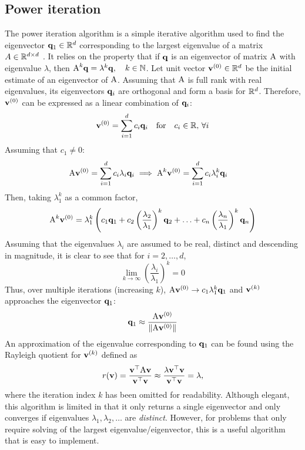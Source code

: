 \subsection{Power iteration}
\label{subsection:power-iteration-c3}
The power iteration algorithm is a simple iterative algorithm used to find the eigenvector ${\mathbf{q}}_1 \in \mathbb{R}^d$ corresponding to the largest eigenvalue of a matrix $A\in \mathbb{R}^{d\times d}$ \cite{panju-iterative-eig}. It relies on the property that if ${\mathbf{q}}$ is an eigenvector of matrix ${\textrm{A}}$ with eigenvalue $\lambda$, then ${\textrm{A}}^k {\mathbf{q}} = \lambda^k{\mathbf{q}}, \quad k\in \mathbb{N}$. Let unit vector ${\mathbf{v}}^{(0)} \in \mathbb{R}^d$ be the initial estimate of an eigenvector of ${\textrm{A}}$. Assuming that ${\textrm{A}}$ is full rank with real eigenvalues, its eigenvectors ${\mathbf{q}}_i$ are orthogonal and form a basis for $\mathbb{R}^d$. Therefore, ${\mathbf{v}}^{(0)}$ can be expressed as a linear combination of ${\mathbf{q}}_i$:
\begin{equation}
    {\mathbf{v}}^{(0)} = \sum_{i=1}^{d} c_i{\mathbf{q}}_i \quad \text{for} \quad c_i \in \mathbb{R}, \, \forall i
\label{eq:power-iter-lin-sum}
\end{equation}
Assuming that $c_1 \neq 0$:
\begin{equation}
\begin{aligned}
{\textrm{A}} {\mathbf{v}}^{(0)} &= \sum_{i=1}^{d} c_i\lambda_i{\mathbf{q}}_i \implies
{\textrm{A}}^{k} {\mathbf{v}}^{(0)} = \sum_{i=1}^{d} c_i\lambda_i^k{\mathbf{q}}_i
\end{aligned}
\end{equation}
Then, taking $\lambda_1^k$ as a common factor,
\begin{equation}
   {\textrm{A}}^{k} {\mathbf{v}}^{(0)} = \lambda_{1}^{k}\left(c_{1} {\mathbf{q}}_{1}+c_{2}\left(\frac{\lambda_{2}}{\lambda_{1}}\right)^{k} {\mathbf{q}}_{2}+\ldots+c_{n}\left(\frac{\lambda_{n}}{\lambda_{1}}\right)^{k} {\mathbf{q}}_{n}\right)
\end{equation}
Assuming that the eigenvalues $\lambda_i$ are assumed to be real, distinct and descending in magnitude, it is clear to see that for $i = 2, \dots, d$,
\begin{equation}
    \lim _{k \rightarrow \infty}\left(\frac{\lambda_{i}}{\lambda_{1}}\right)^{k}=0
\end{equation}
Thus, over multiple iterations (increasing $k$), ${\textrm{A}} {\mathbf{v}}^{(0)} \rightarrow c_1\lambda_1^k {\mathbf{q}}_1$ and ${\mathbf{v}}^{(k)}$ approaches the eigenvector ${\mathbf{q}}_1$:
\begin{equation}
    {\mathbf{q}}_1 \approx \frac{{\textrm{A}} {\mathbf{v}}^{(0)} }{\|{\textrm{A}} {\mathbf{v}}^{(0)} \|}
\end{equation}
An approximation of the eigenvalue corresponding to ${\mathbf{q}}_1$ can be found using the Rayleigh quotient for ${\mathbf{v}}^{(k)}$ defined as 
\begin{equation}
    r({\mathbf{v}}) = \frac{{\mathbf{v}}^\top {\textrm{A}} {\mathbf{v}}}{{\mathbf{v}}^\top {\mathbf{v}}} \approx \frac{\lambda {\mathbf{v}}^\top {\mathbf{v}}}{{\mathbf{v}}^\top {\mathbf{v}}} = \lambda,
\label{eq:rayleigh-quotient}
\end{equation}
where the iteration index $k$ has been omitted for readability. Although elegant, this algorithm is limited in that it only returns a single eigenvector and only converges if eigenvalues $\lambda_1, \lambda_2, \dots$ are \textit{distinct}. However, for problems that only require solving of the largest eigenvalue/eigenvector, this is a useful algorithm that is easy to implement.

